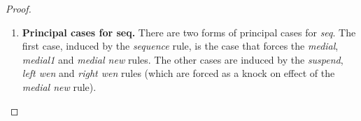 \documentclass[UKenglish,acmsmall,authorversion]{acmart}
\theoremstyle{plain}
\begin{document}
{\begin{proof}
\begin{enumerate}[label=\textbf{\Alph*},ref=\Alph*,leftmargin=*]
\begin{enumerate}[label*=\textbf{.\arabic*}]

\end{enumerate}



\item \textbf{Principal cases for seq.} There are two forms of principal cases for \textit{seq}.
The first case, induced by the \textit{sequence} rule, is the case that forces the \textit{medial}, \textit{medial1} and \textit{medial new} rules.
The other cases are induced by the \textit{suspend}, \textit{left wen} and \textit{right wen} rules (which are forced as a knock on effect of the \textit{medial new} rule).


\end{enumerate}
\end{proof}}
\end{document}
